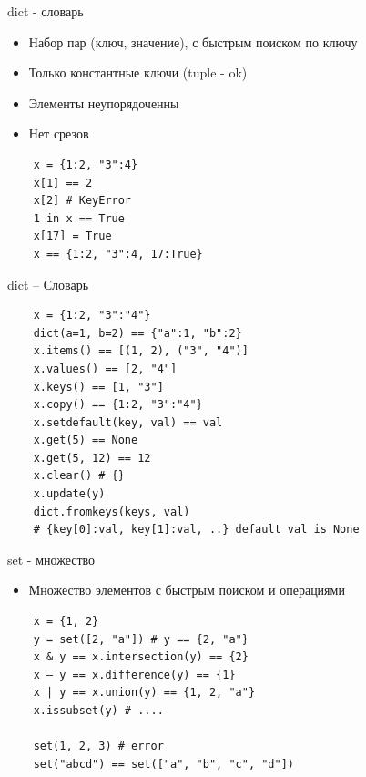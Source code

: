 \documentclass{article}
\begin{document}
\begin{center} dict - словарь \end{center}
\begin{itemize}
	\item Набор пар (ключ, значение), с быстрым поиском по ключу
	\item Только константные ключи (tuple - ok)
	\item Элементы неупорядоченны
	\item Нет срезов
\end{itemize}
\vspace{15pt}
\begin{lstlisting}
    x = {1:2, "3":4}
	x[1] == 2
	x[2] # KeyError
	1 in x == True
	x[17] = True
	x == {1:2, "3":4, 17:True}
\end{lstlisting}
\newpage

\begin{center} dict – Словарь \end{center}
\vspace{15pt}
\begin{lstlisting}
	x = {1:2, "3":"4"}
	dict(a=1, b=2) == {"a":1, "b":2}
	x.items() == [(1, 2), ("3", "4")]
	x.values() == [2, "4"]
	x.keys() == [1, "3"]
	x.copy() == {1:2, "3":"4"}
	x.setdefault(key, val) == val
	x.get(5) == None
	x.get(5, 12) == 12
	x.clear() # {}
	x.update(y)
	dict.fromkeys(keys, val)
	# {key[0]:val, key[1]:val, ..} default val is None
\end{lstlisting}
\newpage

\begin{center} set - множество \end{center}
\begin{itemize}
	\item Множество элементов с быстрым поиском и операциями
\end{itemize}
\vspace{15pt}
\begin{lstlisting}
	x = {1, 2}
	y = set([2, "a"]) # y == {2, "a"}
	x & y == x.intersection(y) == {2}
	x – y == x.difference(y) == {1}
	x | y == x.union(y) == {1, 2, "a"}
	x.issubset(y) # ....

	set(1, 2, 3) # error
	set("abcd") == set(["a", "b", "c", "d"])
\end{lstlisting}
\newpage
\end{document}
